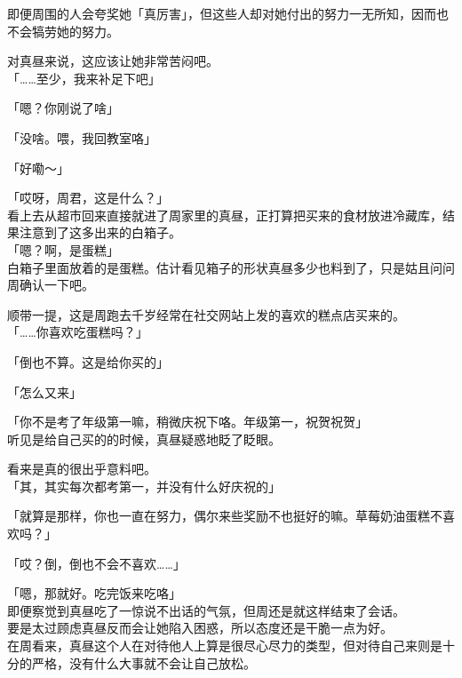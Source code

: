 即便周围的人会夸奖她「真厉害」，但这些人却对她付出的努力一无所知，因而也不会犒劳她的努力。

对真昼来说，这应该让她非常苦闷吧。\\

「……至少，我来补足下吧」

「嗯？你刚说了啥」

「没啥。喂，我回教室咯」

「好嘞～」\\

\vspace{2\baselineskip}

「哎呀，周君，这是什么？」\\

看上去从超市回来直接就进了周家里的真昼，正打算把买来的食材放进冷藏库，结果注意到了这多出来的白箱子。\\

「嗯？啊，是蛋糕」\\

白箱子里面放着的是蛋糕。估计看见箱子的形状真昼多少也料到了，只是姑且问问周确认一下吧。

顺带一提，这是周跑去千岁经常在社交网站上发的喜欢的糕点店买来的。\\

「……你喜欢吃蛋糕吗？」

「倒也不算。这是给你买的」

「怎么又来」

「你不是考了年级第一嘛，稍微庆祝下咯。年级第一，祝贺祝贺」\\

听见是给自己买的的时候，真昼疑惑地眨了眨眼。

看来是真的很出乎意料吧。\\

「其，其实每次都考第一，并没有什么好庆祝的」

「就算是那样，你也一直在努力，偶尔来些奖励不也挺好的嘛。草莓奶油蛋糕不喜欢吗？」

「哎？倒，倒也不会不喜欢……」

「嗯，那就好。吃完饭来吃咯」\\

即便察觉到真昼吃了一惊说不出话的气氛，但周还是就这样结束了会话。\\

要是太过顾虑真昼反而会让她陷入困惑，所以态度还是干脆一点为好。\\

在周看来，真昼这个人在对待他人上算是很尽心尽力的类型，但对待自己来则是十分的严格，没有什么大事就不会让自己放松。

